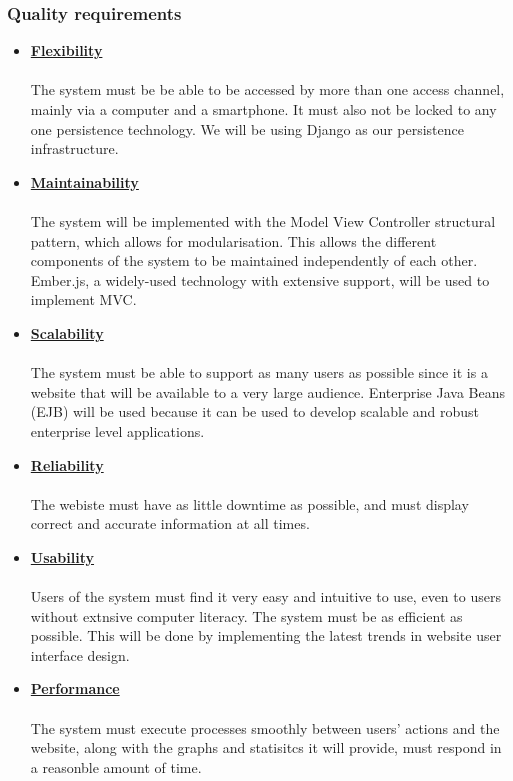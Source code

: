 \documentclass[a4paper,12pt]{article}
\begin{document}
\subsubsection{Quality requirements}
	\begin{itemize}
		\item{\bfseries \underline{Flexibility}}\\\\
		The system must be be able to be accessed  by more than one access channel, mainly via a computer and a 		 		smartphone. It must also not be locked to any one persistence technology. We will be using Django as our persistence 			infrastructure.
		
		\item{\bfseries \underline{Maintainability}}\\\\
		The system will be implemented with the Model View Controller structural pattern, which allows for modularisation. This 			allows the different components of the system to be maintained independently of each other. Ember.js, a 					widely-used technology with extensive support, will be used to implement MVC.
		
		\item{\bfseries \underline{Scalability}}\\\\
		The system must be able to support as many users as possible since it is a website that will be available to a very large 			audience. Enterprise Java Beans (EJB) will be used because it can be used to develop scalable and robust enterprise 			level applications.
		
		\item{\bfseries \underline{Reliability}}\\\\
		The webiste must have as little downtime as possible, and must display correct and accurate information at all times.
		
		\item{\bfseries \underline{Usability}}\\\\
		Users of the system must find it very easy and intuitive to use, even to users without extnsive computer literacy. The 			system must be as efficient as possible. This will be done by implementing the latest trends in website user interface 			design.
		
		\item{\bfseries \underline{Performance}}\\\\
		The system must execute processes smoothly between users' actions and the website, along with the graphs and 			statisitcs it will provide, must respond in a reasonble amount of time.
		

\end{itemize}
\end{document}
